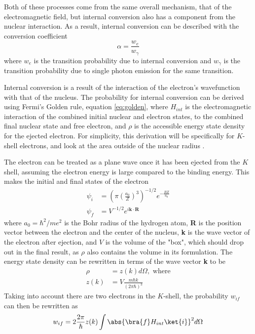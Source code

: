 

Both of these processes come from the same overall mechanism, that of the electromagnetic field, but internal conversion also has a component from the nuclear interaction. As a result, internal conversion can be described with the conversion coefficient
\begin{equation}
\label{eq:conv_coeff}
    \alpha = \frac{w_e}{w_\gamma}
\end{equation}
where $w_e$ is the transition probability due to internal conversion and $w_\gamma$ is the transition probability due to single photon emission for the same transition.

Internal conversion is a result of the interaction of the electron's wavefunction with that of the nucleus. The probability for internal conversion can be derived using Fermi's Golden rule, equation \ref{eq:golden}, where $H_{int}$ is the electromagnetic interaction of the combined initial nuclear and electron states, to the combined final nuclear state and free electron, and $\rho$ is the accessible energy state density for the ejected electron. For simplicity, this derivation will be specifically for $K$-shell electrons, and look at the area outside of the nuclear radius \citep{roy67:_e0, blatt79:_emradiation, segre77:_icradiation}.

The electron can be treated as a plane wave once it has been ejected from the $K$ shell, assuming the electron energy is large compared to the binding energy. This makes the initial and final states of the electron
\begin{subequations}
\begin{align}
    \psi_{i} & = \left(\pi\left(\frac{a_0}{Z}\right)^3\right)^{-1/2}e^{-\frac{RZ}{a_0}}\\
    \psi_{f} & = V^{-1/2}e^{i\textbf{k}\cdot\textbf{R}}
\end{align}
\end{subequations}
where $a_0=\hbar^2/me^2$ is the Bohr radius of the hydrogen atom, \textbf{R} is the position vector between the electron and the center of the nucleus, \textbf{k} is the wave vector of the electron after ejection, and $V$ is the volume of the "box", which should drop out in the final result, as $\rho$ also contains the volume in its formulation. The energy state density can be rewritten in terms of the wave vector \textbf{k} to be 
\begin{align}
    \rho & = z(k)d\Omega, \text{ where} \\
    z(k) & = V\frac{m\hbar k}{(2\pi\hbar)^3}
\end{align}
Taking into account there are two electrons in the $K$-shell, the probability $w_{if}$ can then be rewritten as
\begin{equation}
\label{eq:golden_ic}
    w_{if}=2 \frac{2\pi}{\hbar}z(k)\int\abs{\bra{f}H_{int}\ket{i}}^2d\Omega
\end{equation}

